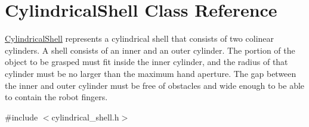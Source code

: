 \hypertarget{class_cylindrical_shell}{\section{\-Cylindrical\-Shell \-Class \-Reference}
\label{class_cylindrical_shell}
}


\hyperlink{class_cylindrical_shell}{\-Cylindrical\-Shell} represents a cylindrical shell that consists of two colinear cylinders. \-A shell consists of an inner and an outer cylinder. \-The portion of the object to be grasped must fit inside the inner cylinder, and the radius of that cylinder must be no larger than the maximum hand aperture. \-The gap between the inner and outer cylinder must be free of obstacles and wide enough to be able to contain the robot fingers.  




{\ttfamily \#include $<$cylindrical\-\_\-shell.\-h$>$}

